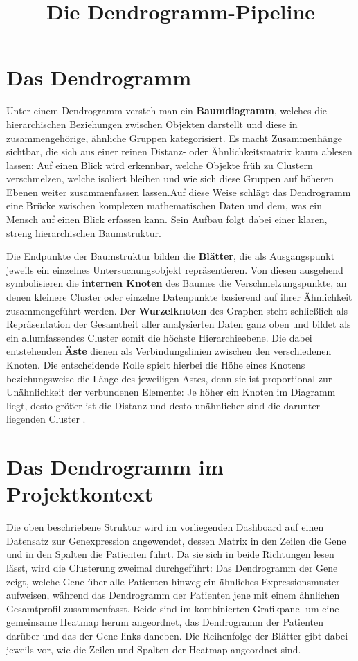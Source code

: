 \documentclass[11pt,a4paper]{article}
\title{Die Dendrogramm-Pipeline}
\author{}
\date{}
\begin{document}
	
	\section{Das Dendrogramm}
	
Unter einem Dendrogramm versteh man ein \textbf{Baumdiagramm}, welches die hierarchischen Beziehungen zwischen Objekten darstellt und diese in zusammengehörige, ähnliche Gruppen kategorisiert. Es macht Zusammenhänge sichtbar, die
sich aus einer reinen Distanz- oder Ähnlichkeitsmatrix kaum ablesen lassen: Auf einen Blick
wird erkennbar, welche Objekte früh zu Clustern verschmelzen, welche isoliert bleiben und wie
sich diese Gruppen auf höheren Ebenen weiter zusammenfassen lassen.Auf diese Weise schlägt das Dendrogramm eine Brücke zwischen komplexen mathematischen Daten und dem, was ein Mensch auf einen Blick erfassen kann. Sein Aufbau folgt dabei einer klaren, streng hierarchischen Baumstruktur.

Die Endpunkte der Baumstruktur bilden die \textbf{Blätter}, die als Ausgangspunkt 
jeweils ein einzelnes Untersuchungsobjekt repräsentieren. Von diesen ausgehend 
symbolisieren die \textbf{internen Knoten} des Baumes die Verschmelzungspunkte, 
an denen kleinere Cluster oder einzelne Datenpunkte basierend auf ihrer Ähnlichkeit 
zusammengeführt werden. Der \textbf{Wurzelknoten} des Graphen steht schließlich 
als Repräsentation der Gesamtheit aller analysierten Daten ganz oben und bildet 
als ein allumfassendes Cluster somit die höchste Hierarchieebene. 
Die dabei entstehenden \textbf{Äste} dienen als Verbindungslinien zwischen den 
verschiedenen Knoten. Die entscheidende Rolle spielt hierbei die Höhe eines 
Knotens beziehungsweise die Länge des jeweiligen Astes, denn sie ist proportional 
zur Unähnlichkeit der verbundenen Elemente: Je höher ein Knoten im Diagramm liegt, 
desto größer ist die Distanz und desto unähnlicher sind die darunter liegenden 
Cluster \cite{ivchenko2026, statistik_einfach_lernen_dendrogramm}.
	
	\section{Das Dendrogramm im Projektkontext}
	
	Die oben beschriebene Struktur wird im vorliegenden Dashboard auf einen Datensatz 
	zur Genexpression angewendet, dessen Matrix in den Zeilen die Gene und in den 
	Spalten die Patienten führt. Da sie sich in beide Richtungen lesen lässt, wird 
	die Clusterung zweimal durchgeführt: Das Dendrogramm der Gene zeigt, welche 
	Gene über alle Patienten hinweg ein ähnliches Expressionsmuster aufweisen, während 
	das Dendrogramm der Patienten jene mit einem ähnlichen Gesamtprofil zusammenfasst. 
	Beide sind im kombinierten Grafikpanel um eine gemeinsame Heatmap herum angeordnet, das Dendrogramm der Patienten darüber und das der Gene links daneben. Die Reihenfolge der Blätter gibt dabei jeweils vor, wie die Zeilen und Spalten der Heatmap angeordnet sind.
	
\end{document}
